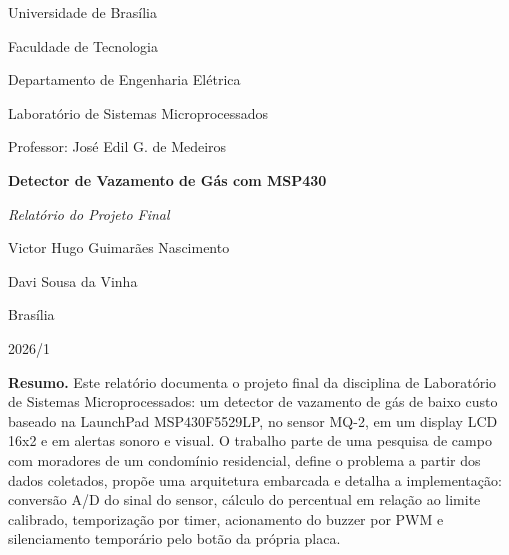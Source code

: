 \documentclass[11pt,a4paper]{article}
\numberwithin{equation}{section}
\begin{document}
\begin{titlepage}
  \centering
  {\large Universidade de Brasília\par}
  \vspace{2pt}
  {\large Faculdade de Tecnologia\par}
  \vspace{2pt}
  {\large Departamento de Engenharia Elétrica\par}
  \vspace{2pt}
  {\large Laboratório de Sistemas Microprocessados\par}

  \vspace{1.8cm}
  {\large Professor: José Edil G. de Medeiros\par}

  \vspace{2.4cm}
  {\Huge\bfseries Detector de Vazamento de Gás com MSP430\par}

  \vspace{0.9cm}
  {\large\itshape Relatório do Projeto Final\par}

  \vspace{2.6cm}
  {\large Victor Hugo Guimarães Nascimento\par}
  \vspace{4pt}
  {\large Davi Sousa da Vinha\par}

  \vfill
  {\large Brasília\par}
  {\large 2026/1\par}
\end{titlepage}

\begin{center}
  \begin{minipage}{0.86\textwidth}
    \small
    \textbf{Resumo.} Este relatório documenta o projeto final da disciplina de Laboratório de
    Sistemas Microprocessados: um detector de vazamento de gás de baixo custo baseado na LaunchPad
    MSP430F5529LP, no sensor MQ-2, em um display LCD 16x2 e em alertas sonoro e visual. O trabalho
    parte de uma pesquisa de campo com moradores de um condomínio residencial, define o problema a
    partir dos dados coletados, propõe uma arquitetura embarcada e detalha a implementação:
    conversão A/D do sinal do sensor, cálculo do percentual em relação ao limite calibrado,
    temporização por timer, acionamento do buzzer por PWM e silenciamento temporário pelo botão da
    própria placa.
  \end{minipage}
\end{center}
\end{document}
